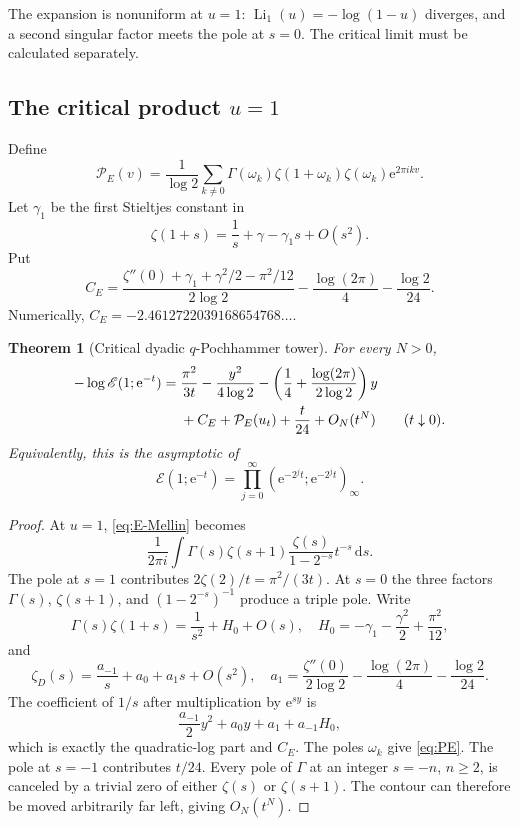 \documentclass[11pt,oneside]{article}
\numberwithin{equation}{section}
\theoremstyle{plain}
\newtheorem{theorem}{Theorem}[section]
\theoremstyle{definition}
\theoremstyle{remark}
\newcommand{\Li}{\operatorname{Li}}
\newcommand{\dd}{\,\mathrm{d}}
\newcommand{\Ecal}{\mathscr E}
\newcommand{\Pcal}{\mathcal P}
\newcommand{\e}{\mathrm e}
\begin{document}
The expansion is nonuniform at $u=1$: $\Li_1(u)=-\log(1-u)$ diverges, and a second singular factor meets the pole at $s=0$.  The critical limit must be calculated separately.

\subsection{The critical product $u=1$}

Define
\begin{equation}\label{eq:PE}
 \Pcal_E(v)=\frac1{\log2}
 \sum_{k\ne0}\Gamma(\omega_k)\zeta(1+\omega_k)
 \zeta(\omega_k)\e^{2\pi ikv}.
\end{equation}
Let $\gamma_1$ be the first Stieltjes constant in
\[
 \zeta(1+s)=\frac1s+\gamma-\gamma_1s+O(s^2).
\]
Put
\begin{equation}\label{eq:CE}
 C_E=
 \frac{\zeta''(0)+\gamma_1+\gamma^2/2-\pi^2/12}{2\log2}
 -\frac{\log(2\pi)}4-\frac{\log2}{24}.
\end{equation}
Numerically, $C_E=-2.4612722039168654768\ldots$.

\begin{theorem}[Critical dyadic $q$-Pochhammer tower]\label{thm:E-critical}
For every $N>0$,
\begin{align}\label{eq:E-critical-asymp}
 -\log\Ecal(1;\e^{-t})
 ={}&\frac{\pi^2}{3t}
 -\frac{y^2}{4\log2}
 -\left(\frac14+\frac{\log(2\pi)}{2\log2}\right)y\\
 &+C_E+\Pcal_E(u_t)+\frac{t}{24}+O_N(t^N)
 \qquad(t\downarrow0).\notag
\end{align}
Equivalently, this is the asymptotic of
\begin{equation}\label{eq:E1-tower}
 \Ecal(1;\e^{-t})
 =\prod_{j=0}^{\infty}
 (\e^{-2^jt};\e^{-2^jt})_\infty.
\end{equation}
\end{theorem}

\begin{proof}
At $u=1$, \cref{eq:E-Mellin} becomes
\[
 \frac1{2\pi i}\int
 \Gamma(s)\zeta(s+1)\frac{\zeta(s)}{1-2^{-s}}t^{-s}\dd s.
\]
The pole at $s=1$ contributes $2\zeta(2)/t=\pi^2/(3t)$.  At $s=0$ the three factors $\Gamma(s)$, $\zeta(s+1)$, and $(1-2^{-s})^{-1}$ produce a triple pole.  Write
\[
 \Gamma(s)\zeta(1+s)
 =\frac1{s^2}+H_0+O(s),
 \quad
 H_0=-\gamma_1-\frac{\gamma^2}{2}+\frac{\pi^2}{12},
\]
and
\[
 \zeta_D(s)=\frac{a_{-1}}s+a_0+a_1s+O(s^2),
 \quad
 a_1=\frac{\zeta''(0)}{2\log2}
 -\frac{\log(2\pi)}4-\frac{\log2}{24}.
\]
The coefficient of $1/s$ after multiplication by $\e^{sy}$ is
\[
 \frac{a_{-1}}2y^2+a_0y+a_1+a_{-1}H_0,
\]
which is exactly the quadratic-log part and $C_E$.  The poles $\omega_k$ give \cref{eq:PE}.  The pole at $s=-1$ contributes $t/24$.  Every pole of $\Gamma$ at an integer $s=-n$, $n\ge2$, is canceled by a trivial zero of either $\zeta(s)$ or $\zeta(s+1)$.  The contour can therefore be moved arbitrarily far left, giving $O_N(t^N)$.
\end{proof}
\end{document}
